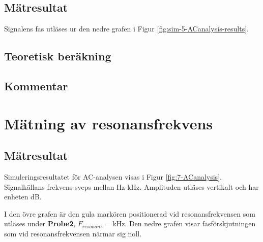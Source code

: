 \documentclass[11pt,a4paper]{article}
\begin{document}
\subsection{Mätresultat}\label{}
Signalens fas utläses ur den nedre grafen i Figur \ref{fig:sim-5-ACanalysis-results}.

\subsection{Teoretisk beräkning}\label{}

\subsection{Kommentar}\label{}

\clearpage

\section{Mätning av resonansfrekvens}\label{}

\subsection{Mätresultat}\label{}
Simuleringsresultatet för AC-analysen visas i Figur \ref{fig:7-ACanalysis}.
Signalkällans frekvens sveps mellan \unit[100]{\si{\Hz}}-\unit[100]{\si{\kHz}}.
Amplituden utläses vertikalt och har enheten \si{\dB}.
\par I den övre grafen är den gula markören positionerad vid resonansfrekvensen 
som utläses under \textbf{Probe2}, $F_{resonans} = $\unit[15,8489]{\si{\kHz}}.
Den nedre grafen visar fasförskjutningen som vid resonansfrekvensen närmar sig noll.
\end{document}
